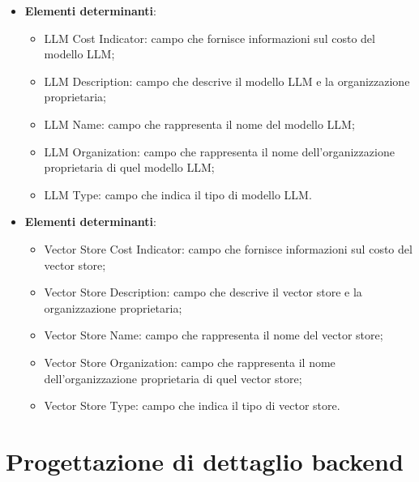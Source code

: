 \documentclass[10pt, a4paper]{article}
\begin{document}
\label{LLMCardDettaglio}
\begin{itemize}
    \item \textbf{Elementi determinanti}:
     \begin{itemize}
        \item LLM Cost Indicator: campo che fornisce informazioni sul costo del modello LLM;
        \item LLM Description: campo che descrive il modello LLM e la organizzazione proprietaria;
        \item LLM Name: campo che rappresenta il nome del modello LLM;
        \item LLM Organization: campo che rappresenta il nome dell'organizzazione proprietaria di quel modello LLM;
        \item LLM Type: campo che indica il tipo di modello LLM.
        
    \end{itemize}
\end{itemize}


\label{VectorStoreCardDettaglio}
\begin{itemize}
    \item \textbf{Elementi determinanti}:
     \begin{itemize}
        \item Vector Store Cost Indicator: campo che fornisce informazioni sul costo del vector store;
        \item Vector Store Description: campo che descrive il vector store e la organizzazione proprietaria;
        \item Vector Store Name: campo che rappresenta il nome del vector store;
        \item Vector Store Organization: campo che rappresenta il nome dell'organizzazione proprietaria di quel vector store;
        \item Vector Store Type: campo che indica il tipo di vector store.
    \end{itemize}
\end{itemize}









\newpage
   
\section{Progettazione di dettaglio backend}
\end{document}
